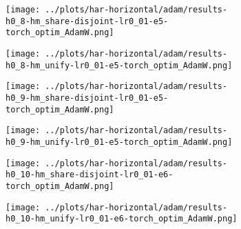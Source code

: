 \begin{figure}[htbp]  %
    \centering
    \begin{subfigure}[b]{0.47\textwidth}
        \centering
        \texttt{[image: ../plots/har-horizontal/adam/results-h0\_8-hm\_share-disjoint-lr0\_01-e5-torch\_optim\_AdamW.png]}
    \end{subfigure}
    \hfill
    \begin{subfigure}[b]{0.47\textwidth}
        \centering
        \texttt{[image: ../plots/har-horizontal/adam/results-h0\_8-hm\_unify-lr0\_01-e5-torch\_optim\_AdamW.png]}
    \end{subfigure}
\end{figure}
\begin{figure}[htbp]  %
    \centering
    \begin{subfigure}[b]{0.47\textwidth}
        \centering
        \texttt{[image: ../plots/har-horizontal/adam/results-h0\_9-hm\_share-disjoint-lr0\_01-e5-torch\_optim\_AdamW.png]}
    \end{subfigure}
    \hfill
    \begin{subfigure}[b]{0.47\textwidth}
        \centering
        \texttt{[image: ../plots/har-horizontal/adam/results-h0\_9-hm\_unify-lr0\_01-e5-torch\_optim\_AdamW.png]}
    \end{subfigure}
\end{figure}
\begin{figure}[htbp]  %
    \centering
    \begin{subfigure}[b]{0.47\textwidth}
        \centering
        \texttt{[image: ../plots/har-horizontal/adam/results-h0\_10-hm\_share-disjoint-lr0\_01-e6-torch\_optim\_AdamW.png]}
    \end{subfigure}
    \hfill
    \begin{subfigure}[b]{0.47\textwidth}
        \centering
        \texttt{[image: ../plots/har-horizontal/adam/results-h0\_10-hm\_unify-lr0\_01-e6-torch\_optim\_AdamW.png]}
    \end{subfigure}
\end{figure}

